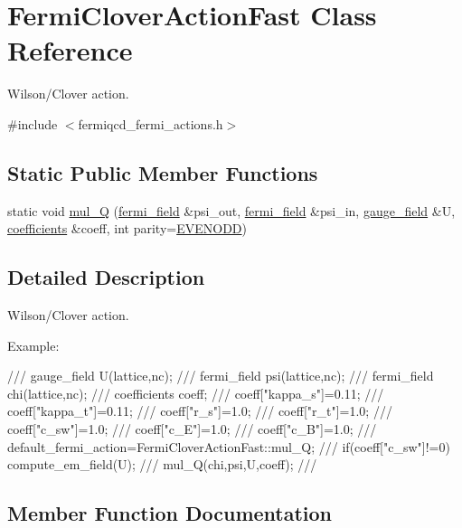 \hypertarget{class_fermi_clover_action_fast}{}\section{Fermi\+Clover\+Action\+Fast Class Reference}
\label{class_fermi_clover_action_fast}


Wilson/\+Clover action.  




{\ttfamily \#include $<$fermiqcd\+\_\+fermi\+\_\+actions.\+h$>$}

\subsection*{Static Public Member Functions}
\begin{DoxyCompactItemize}
\item 
static void \hyperlink{class_fermi_clover_action_fast_a59f9e2ae136b1b0f490c9157db70c102}{mul\+\_\+Q} (\hyperlink{classfermi__field}{fermi\+\_\+field} \&psi\+\_\+out, \hyperlink{classfermi__field}{fermi\+\_\+field} \&psi\+\_\+in, \hyperlink{classgauge__field}{gauge\+\_\+field} \&U, \hyperlink{classcoefficients}{coefficients} \&coeff, int parity=\hyperlink{mdp__global__vars_8h_a4c9de81f2de5a74b588107b6c0afb9ee}{E\+V\+E\+N\+O\+DD})
\end{DoxyCompactItemize}


\subsection{Detailed Description}
Wilson/\+Clover action. 

Example\+: \begin{DoxyVerb}/// gauge_field U(lattice,nc);
/// fermi_field psi(lattice,nc);
/// fermi_field chi(lattice,nc);
/// coefficients coeff;
/// coeff["kappa_s"]=0.11;
/// coeff["kappa_t"]=0.11;
/// coeff["r_s"]=1.0;
/// coeff["r_t"]=1.0;
/// coeff["c_{sw}"]=1.0;
/// coeff["c_E"]=1.0;
/// coeff["c_B"]=1.0;
/// default_fermi_action=FermiCloverActionFast::mul_Q;
/// if(coeff["c_{sw}"]!=0) compute_em_field(U);
/// mul_Q(chi,psi,U,coeff);
/// \end{DoxyVerb}
 

\subsection{Member Function Documentation}
\mbox{\label{class_fermi_clover_action_fast_a59f9e2ae136b1b0f490c9157db70c102}} 

